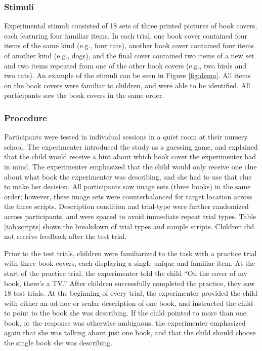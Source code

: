 \documentclass[man]{apa2}
\begin{document}

\subsubsection{Stimuli}

Experimental stimuli consisted of 18 sets of three printed pictures of book covers, each featuring four familiar items. In each trial, one book cover contained four items of the same kind (e.g., four cats), another book cover contained four items of another kind (e.g., dogs), and the final cover contained two items of a new set and two items repeated from one of the other book covers (e.g., two birds and two cats). An example of the stimuli can be seen in Figure \ref{fig:demo}. All items on the book covers were familiar to children, and were able to be identified. All participants saw the book covers in the same order.

\subsubsection{Procedure}

Participants were tested in individual sessions in a quiet room at their nursery school. The experimenter introduced the study as a guessing game, and explained that the child would receive a hint about which book cover the experimenter had in mind. The experimenter emphasized that the child would only receive one clue about what book the experimenter was describing, and she had to use that clue to make her decision. All participants saw image sets (three books) in the same order; however, these image sets were counterbalanced for target location across the three scripts. Description condition and trial-type were further randomized across participants, and were spaced to avoid immediate repeat trial types. Table \ref{tab:scripts} shows the breakdown of trial types and sample scripts. Children did not receive feedback after the test trial.

Prior to the test trials, children were familiarized to the task with a practice trial with three book covers, each displaying a single unique and familiar item. At the start of the practice trial, the experimenter told the child ``On the cover of my book, there's a TV.'' After children successfully completed the practice, they saw 18 test trials. At the beginning of every trial, the experimenter provided the child with either an ad-hoc or scalar description of one book, and instructed the child to point to the book she was describing. If the child pointed to more than one book, or the response was otherwise ambiguous, the experimenter emphasized again that she was talking about just one book, and that the child should choose the single book she was describing.
\end{document}
